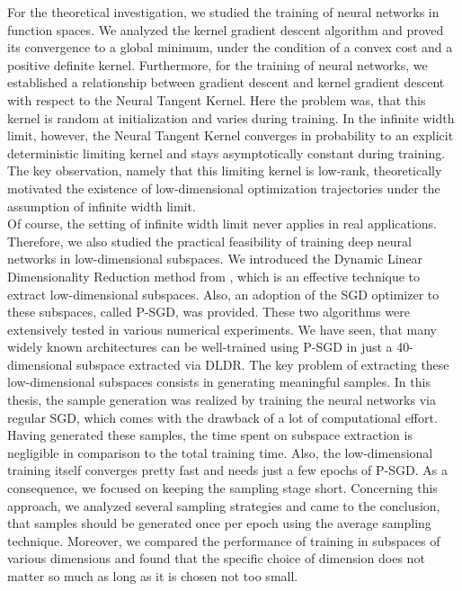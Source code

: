 \documentclass[11pt, a4paper]{article}
\begin{document}
For the theoretical investigation, we studied the training of neural networks in function spaces. We analyzed the kernel gradient descent algorithm and proved its convergence to a global minimum, under the condition of a convex cost and a positive definite kernel. Furthermore, for the training of neural networks, we established a relationship between gradient descent and kernel gradient descent with respect to the Neural Tangent Kernel. Here the problem was, that this kernel is random at initialization and varies during training. In the infinite width limit, however, the Neural Tangent Kernel converges in probability to an explicit deterministic limiting kernel and stays asymptotically constant during training. The key observation, namely that this limiting kernel is low-rank, theoretically motivated the existence of low-dimensional optimization trajectories under the assumption of infinite width limit. \\

Of course, the setting of infinite width limit never applies in real applications. Therefore, we also studied the practical feasibility of training deep neural networks in low-dimensional subspaces. We introduced the Dynamic Linear Dimensionality Reduction method from \cite{Paper}, which is an effective technique to extract low-dimensional subspaces. Also, an adoption of the SGD optimizer to these subspaces, called P-SGD, was provided. These two algorithms were extensively tested in various numerical experiments. We have seen, that many widely known architectures can be well-trained using P-SGD in just a 40-dimensional subspace extracted via DLDR. The key problem of extracting these low-dimensional subspaces consists in generating meaningful samples. In this thesis, the sample generation was realized by training the neural networks via regular SGD, which comes with the drawback of a lot of computational effort. Having generated these samples, the time spent on subspace extraction is negligible in comparison to the total training time. Also, the low-dimensional training itself converges pretty fast and needs just a few epochs of P-SGD. As a consequence, we focused on keeping the sampling stage short. Concerning this approach, we analyzed several sampling strategies and came to the conclusion, that samples should be generated once per epoch using the average sampling technique. Moreover, we compared the performance of training in subspaces of various dimensions and found that the specific choice of dimension does not matter so much as long as it is chosen not too small. \\
\end{document}
